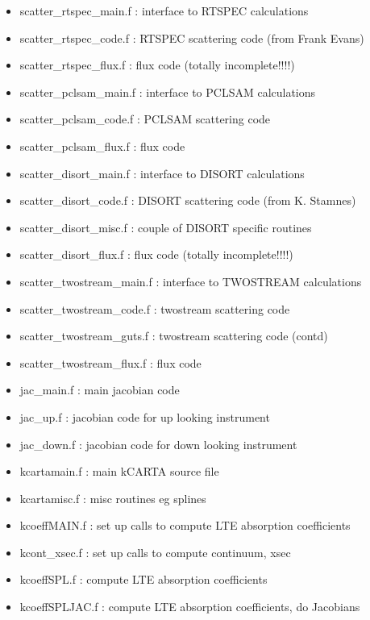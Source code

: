 \documentclass[12pt]{article}
\newcommand{\kc}{\textsf{kCARTA}\xspace}
\begin{document}
\begin{itemize}
\item {\sf scatter\_rtspec\_main.f} : interface to RTSPEC calculations
\item {\sf scatter\_rtspec\_code.f} : RTSPEC scattering code (from Frank Evans)
\item {\sf scatter\_rtspec\_flux.f} : flux code (totally incomplete!!!!)

\item {\sf scatter\_pclsam\_main.f} : interface to PCLSAM calculations
\item {\sf scatter\_pclsam\_code.f} : PCLSAM scattering code 
\item {\sf scatter\_pclsam\_flux.f} : flux code

\item {\sf scatter\_disort\_main.f} : interface to DISORT calculations
\item {\sf scatter\_disort\_code.f} : DISORT scattering code (from K. Stamnes)
\item {\sf scatter\_disort\_misc.f} : couple of DISORT specific routines
\item {\sf scatter\_disort\_flux.f} : flux code (totally incomplete!!!!)

\item {\sf scatter\_twostream\_main.f} : interface to TWOSTREAM calculations
\item {\sf scatter\_twostream\_code.f} : twostream scattering code 
\item {\sf scatter\_twostream\_guts.f} : twostream scattering code (contd)
\item {\sf scatter\_twostream\_flux.f} : flux code 

\item {\sf jac\_main.f} : main jacobian code
\item {\sf jac\_up.f} : jacobian code for up looking instrument
\item {\sf jac\_down.f} : jacobian code for down looking instrument

\item {\sf kcartamain.f} : main \kc source file
\item {\sf kcartamisc.f} : misc routines eg splines

\item {\sf kcoeffMAIN.f} : set up calls to compute LTE absorption coefficients
\item {\sf kcont\_xsec.f} : set up calls to compute continuum, xsec
\item {\sf kcoeffSPL.f}  : compute LTE absorption coefficients
\item {\sf kcoeffSPLJAC.f}  : compute LTE absorption coefficients, do Jacobians


\end{itemize}
\end{document}
